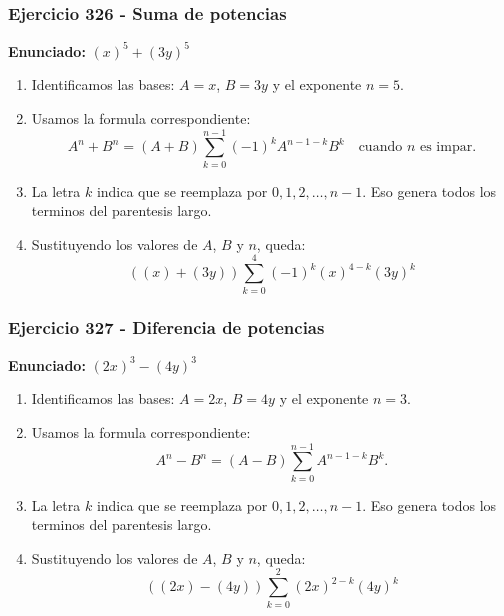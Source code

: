 \documentclass[11pt,a4paper]{article}
\begin{document}
\subsubsection*{Ejercicio 326 - Suma de potencias}
\textbf{Enunciado:} $ \left(x\right)^{5}+\left(3 y\right)^{5} $\par
\begin{enumerate}[leftmargin=2em]
\item Identificamos las bases: \(A=x\), \(B=3 y\) y el exponente \(n=5\).
\item Usamos la formula correspondiente: \[A^n+B^n=(A+B)\sum_{k=0}^{n-1}(-1)^kA^{n-1-k}B^k\quad\text{cuando }n\text{ es impar}.\]
\item La letra \(k\) indica que se reemplaza por \(0,1,2,\ldots,n-1\). Eso genera todos los terminos del parentesis largo.
\item Sustituyendo los valores de \(A\), \(B\) y \(n\), queda: \[\boxed{\left(\left(x\right)+\left(3 y\right)\right)\sum_{k=0}^{4}(-1)^k\left(x\right)^{4-k}\left(3 y\right)^k}\]
\end{enumerate}

\vspace{0.2cm}
\subsubsection*{Ejercicio 327 - Diferencia de potencias}
\textbf{Enunciado:} $ \left(2 x\right)^{3}-\left(4 y\right)^{3} $\par
\begin{enumerate}[leftmargin=2em]
\item Identificamos las bases: \(A=2 x\), \(B=4 y\) y el exponente \(n=3\).
\item Usamos la formula correspondiente: \[A^n-B^n=(A-B)\sum_{k=0}^{n-1}A^{n-1-k}B^k.\]
\item La letra \(k\) indica que se reemplaza por \(0,1,2,\ldots,n-1\). Eso genera todos los terminos del parentesis largo.
\item Sustituyendo los valores de \(A\), \(B\) y \(n\), queda: \[\boxed{\left(\left(2 x\right)-\left(4 y\right)\right)\sum_{k=0}^{2}\left(2 x\right)^{2-k}\left(4 y\right)^k}\]
\end{enumerate}

\vspace{0.2cm}
\end{document}
